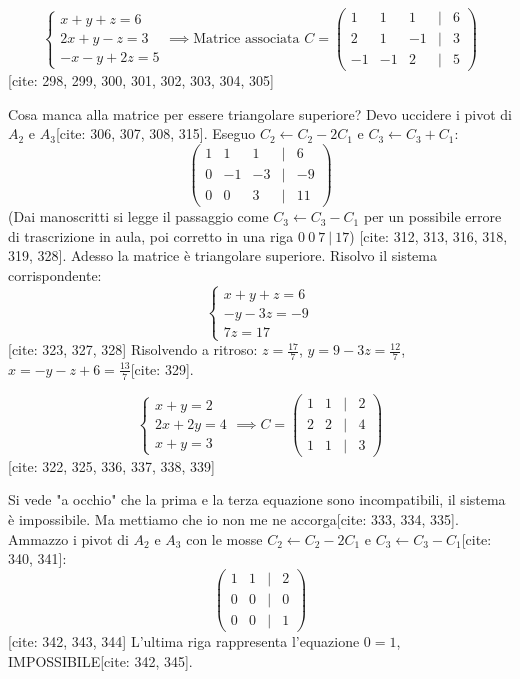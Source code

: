 \documentclass[11pt,a4paper]{article}
\begin{document}
\begin{esercizio}
$$
\begin{cases}
x + y + z = 6 \\
2x + y - z = 3 \\
-x - y + 2z = 5
\end{cases}
\implies
\text{Matrice associata } C = \begin{pmatrix}
1 & 1 & 1 & | & 6 \\
2 & 1 & -1 & | & 3 \\
-1 & -1 & 2 & | & 5
\end{pmatrix}
$$
[cite: 298, 299, 300, 301, 302, 303, 304, 305]

Cosa manca alla matrice per essere triangolare superiore? Devo uccidere i pivot di $A_2$ e $A_3$[cite: 306, 307, 308, 315].
Eseguo $C_2 \leftarrow C_2 - 2C_1$ e $C_3 \leftarrow C_3 + C_1$:
$$
\begin{pmatrix}
1 & 1 & 1 & | & 6 \\
0 & -1 & -3 & | & -9 \\
0 & 0 & 3 & | & 11
\end{pmatrix}
$$
(Dai manoscritti si legge il passaggio come $C_3 \leftarrow C_3 - C_1$ per un possibile errore di trascrizione in aula, poi corretto in una riga $0 \ 0 \ 7 \ | \ 17$) [cite: 312, 313, 316, 318, 319, 328].
Adesso la matrice è triangolare superiore. Risolvo il sistema corrispondente:
$$
\begin{cases}
x + y + z = 6 \\
-y - 3z = -9 \\
7z = 17
\end{cases}
$$
[cite: 323, 327, 328]
Risolvendo a ritroso:
$z = \frac{17}{7}$, 
$y = 9 - 3z = \frac{12}{7}$, 
$x = -y - z + 6 = \frac{13}{7}$[cite: 329].
\end{esercizio}

\begin{esercizio}
$$
\begin{cases}
x + y = 2 \\
2x + 2y = 4 \\
x + y = 3
\end{cases}
\implies
C = \begin{pmatrix}
1 & 1 & | & 2 \\
2 & 2 & | & 4 \\
1 & 1 & | & 3
\end{pmatrix}
$$
[cite: 322, 325, 336, 337, 338, 339]

Si vede "a occhio" che la prima e la terza equazione sono incompatibili, il sistema è impossibile. Ma mettiamo che io non me ne accorga[cite: 333, 334, 335].
Ammazzo i pivot di $A_2$ e $A_3$ con le mosse $C_2 \leftarrow C_2 - 2C_1$ e $C_3 \leftarrow C_3 - C_1$[cite: 340, 341]:
$$
\begin{pmatrix}
1 & 1 & | & 2 \\
0 & 0 & | & 0 \\
0 & 0 & | & 1
\end{pmatrix}
$$
[cite: 342, 343, 344]
L'ultima riga rappresenta l'equazione $0 = 1$, IMPOSSIBILE[cite: 342, 345].
\end{esercizio}
\end{document}
